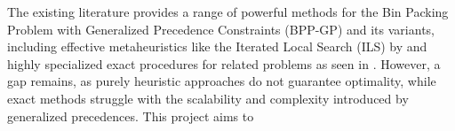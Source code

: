 \documentclass[12pt]{article}
\begin{document}
The existing literature provides a range of powerful methods for the Bin Packing Problem with Generalized 
Precedence Constraints (BPP-GP) and its variants, including effective metaheuristics like the Iterated 
Local Search (ILS) by \cite{kramer:17} and highly specialized exact procedures for related problems 
as seen in \cite{pereira:16}. However, a gap remains, as purely heuristic approaches do not guarantee optimality, 
while exact methods struggle with the scalability and complexity introduced by generalized precedences. 
This project aims to %






\end{document}
